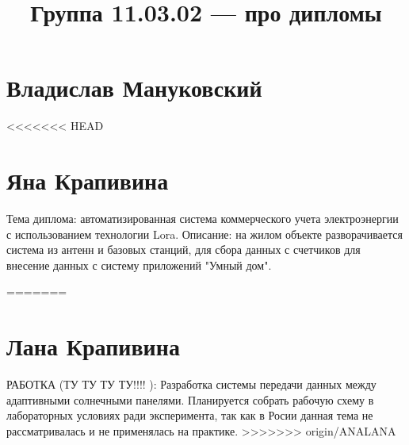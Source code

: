 \documentclass{article}
\title{Группа 11.03.02 --- про дипломы}
\begin{document}
\section*{Владислав Мануковский}

<<<<<<< HEAD
\section*{Яна Крапивина}
Тема диплома: автоматизированная система коммерческого учета электроэнергии с использованием технологии Lora.
Описание: на жилом объекте разворачивается система из антенн и базовых станций, для сбора данных с счетчиков для внесение данных с систему приложений "Умный дом".

=======
\section*{Лана Крапивина}
РАБОТКА (ТУ ТУ ТУ ТУ!!!! ): Разработка системы передачи данных между адаптивными солнечными панелями. Планируется собрать рабочую схему в лабораторных условиях ради эксперимента, так как в Росии данная тема не рассматривалась и не применялась на практике.
>>>>>>> origin/ANALANA
\end{document}
